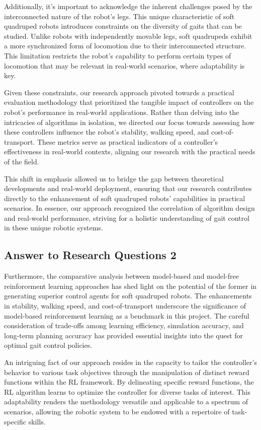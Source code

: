 Additionally, it's important to acknowledge the inherent challenges posed by the interconnected nature of the robot's legs. This unique characteristic of soft quadruped robots introduces constraints on the diversity of gaits that can be studied. Unlike robots with independently movable legs, soft quadrupeds exhibit a more synchronized form of locomotion due to their interconnected structure. This limitation restricts the robot's capability to perform certain types of locomotion that may be relevant in real-world scenarios, where adaptability is key.

Given these constraints, our research approach pivoted towards a practical evaluation methodology that prioritized the tangible impact of controllers on the robot's performance in real-world applications. Rather than delving into the intricacies of algorithms in isolation, we directed our focus towards assessing how these controllers influence the robot's stability, walking speed, and cost-of-transport. These metrics serve as practical indicators of a controller's effectiveness in real-world contexts, aligning our research with the practical needs of the field.

This shift in emphasis allowed us to bridge the gap between theoretical developments and real-world deployment, ensuring that our research contributes directly to the enhancement of soft quadruped robots' capabilities in practical scenarios. In essence, our approach recognized the correlation of algorithm design and real-world performance, striving for a holistic understanding of gait control in these unique robotic systems.

\subsection{Answer to Research Questions 2}
Furthermore, the comparative analysis between model-based and model-free reinforcement learning approaches has shed light on the potential of the former in generating superior control agents for soft quadruped robots. The enhancements in stability, walking speed, and cost-of-transport underscore the significance of model-based reinforcement learning as a benchmark in this project. The careful consideration of trade-offs among learning efficiency, simulation accuracy, and long-term planning accuracy has provided essential insights into the quest for optimal gait control policies.

An intriguing fact of our approach resides in the capacity to tailor the controller's behavior to various task objectives through the manipulation of distinct reward functions within the RL framework. By delineating specific reward functions, the RL algorithm learns to optimize the controller for diverse tasks of interest. This adaptability renders the methodology versatile and applicable to a spectrum of scenarios, allowing the robotic system to be endowed with a repertoire of task-specific skills.


